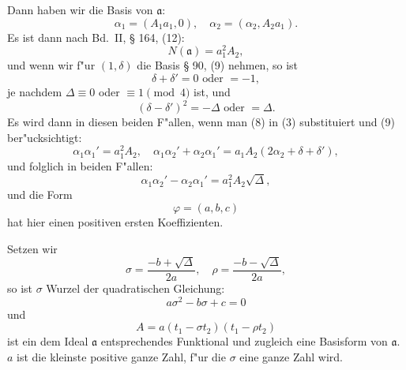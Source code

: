 \documentclass[12pt,a4paper]{article}
\theoremstyle{plain}
\begin{document}
Dann haben wir die Basis von $\mathfrak{a}$:
\begin{equation}
\alpha_1 = (A_1 a_1, 0),\quad \alpha_2 = (\alpha_2, A_2 a_1).
\tag{8}
\end{equation}
Es ist dann nach Bd.~II, \S{} 164, (12):
\[
N(\mathfrak{a}) = a_1^2 A_2,
\]
und wenn wir f"ur $(1, \delta)$ die Basis \S{} 90, (9) nehmen, so ist
\[
\delta + \delta' = 0 \text{ oder } = -1,
\]
je nachdem $\Delta \equiv 0$ oder $\equiv 1 \pmod{4}$ ist, und
\[
(\delta - \delta')^2 = -\Delta \text{ oder } = \Delta.
\]
Es wird dann in diesen beiden F"allen, wenn man (8) in (3) substituiert und (9) ber"ucksichtigt:
\[
\alpha_1\alpha_1' = a_1^2 A_2,\quad \alpha_1\alpha_2' + \alpha_2\alpha_1' = a_1 A_2(2\alpha_2 + \delta + \delta'),
\]
und folglich in beiden F"allen:
\begin{equation}
\alpha_1\alpha_2' - \alpha_2\alpha_1' = a_1^2 A_2\sqrt{\Delta},
\tag{11}
\end{equation}
und die Form
\begin{equation}
\varphi = (a, b, c)
\tag{12}
\end{equation}
hat hier einen positiven ersten Koeffizienten.

Setzen wir
\[
\sigma = \frac{-b + \sqrt{\Delta}}{2a},\quad \rho = \frac{-b - \sqrt{\Delta}}{2a},
\]
so ist $\sigma$ Wurzel der quadratischen Gleichung:
\begin{equation}
a\sigma^2 - b\sigma + c = 0
\tag{13}
\end{equation}
und
\begin{equation}
A = a(t_1 - \sigma t_2)(t_1 - \rho t_2)
\tag{14}
\end{equation}
ist ein dem Ideal $\mathfrak{a}$ entsprechendes Funktional und zugleich eine Basisform von $\mathfrak{a}$. $a$ ist die kleinste positive ganze Zahl, f"ur die $\sigma$ eine ganze Zahl wird.
\end{document}
